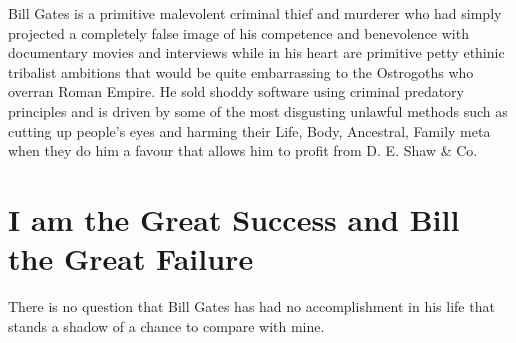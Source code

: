 \documentclass{amsart}
\begin{document}
Bill Gates is a primitive malevolent criminal thief and murderer who had simply projected a completely false image of his competence and benevolence with documentary movies and interviews while in his heart are primitive petty ethinic tribalist ambitions that would be quite embarrassing to the Ostrogoths who overran Roman Empire.  He sold shoddy software using criminal predatory principles and is driven by some of the most disgusting unlawful methods such as cutting up people's eyes and harming their Life, Body, Ancestral, Family meta when they do him a favour that allows him to profit from D. E. Shaw \& Co.


\section{I am the Great Success and Bill the Great Failure}

There is no question that Bill Gates has had no accomplishment in his life that stands a shadow of a chance to compare with mine.
\end{document}
